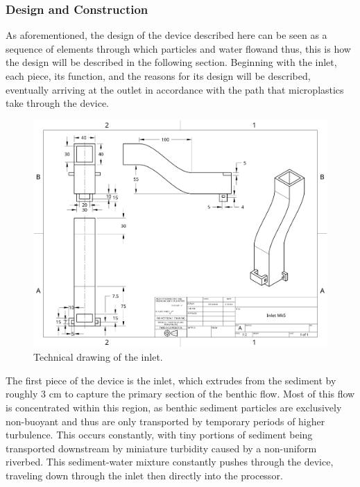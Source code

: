 \documentclass[fleqn,10pt]{SelfArx} %
\begin{document}
	\subsubsection{Design and Construction}
	As aforementioned, the design of the device described here can be seen as a sequence of elements through which particles and water flow\textemdash and thus, this is how the design will be described in the following section. Beginning with the inlet, each piece, its function, and the reasons for its design will be described, eventually arriving at the outlet in accordance with the path that microplastics take through the device. 
	\begin{figure}[h]
		\centering
		\includegraphics[width=1\linewidth]{Figures/TechInlet}
		\caption[Inlet Tech. Drawing]{Technical drawing of the inlet.}
		\label{fig:techinlet}
	\end{figure}
	The first piece of the device is the inlet, which extrudes from the sediment by roughly 3 cm to capture the primary section of the benthic flow. Most of this flow is concentrated within this region, as benthic sediment particles are exclusively non-buoyant and thus are only transported by temporary periods of higher turbulence. This occurs constantly, with tiny portions of sediment being transported downstream by miniature turbidity caused by a non-uniform riverbed. This sediment-water mixture constantly pushes through the device, traveling down through the inlet then directly into the processor. 
\end{document}
